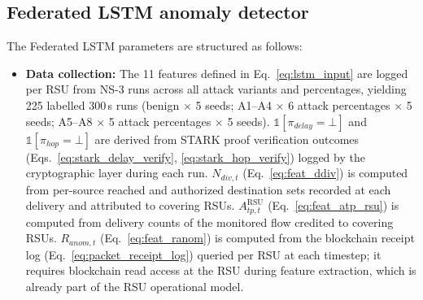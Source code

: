 \documentclass[12pt, a4paper]{report}
\begin{document}
{{\begin{itemize}
\end{itemize}

\subsection{Federated LSTM anomaly detector}
\label{sec:fed_lstm_params}
The Federated LSTM parameters are structured as follows:

\begin{itemize}
  \item \textbf{Data collection:}
The 11 features defined in
Eq.~\ref{eq:lstm_input} are logged per \ac{RSU}
from NS-3 runs across all attack variants and
percentages, yielding 225 labelled 300\,s runs (benign $\times$ 5 seeds;
A1--A4 $\times$ 6 attack percentages $\times$ 5 seeds; A5--A8
$\times$ 5 attack percentages $\times$ 5 seeds).
$\mathbb{1}[\pi_{delay}{=}\bot]$ and
$\mathbb{1}[\pi_{hop}{=}\bot]$ are derived from
\ac{STARK} proof verification outcomes
(Eqs.~\ref{eq:stark_delay_verify},
\ref{eq:stark_hop_verify}) logged by the
cryptographic layer during each run.
$N_{div,t}$ (Eq.~\ref{eq:feat_ddiv}) is computed
from per-source reached and authorized destination
sets recorded at each delivery and attributed to
covering \ac{RSU}s.
$A^{\mathrm{RSU}}_{tp,t}$ (Eq.~\ref{eq:feat_atp_rsu}) is
computed from delivery counts of the monitored flow
credited to covering \ac{RSU}s.
$R_{anom,t}$ (Eq.~\ref{eq:feat_ranom}) is computed
from the blockchain receipt log
(Eq.~\ref{eq:packet_receipt_log}) queried per
\ac{RSU} at each timestep; it requires blockchain
read access at the \ac{RSU} during feature
extraction, which is already part of the \ac{RSU}
operational model.


\end{itemize}}}
\end{document}
